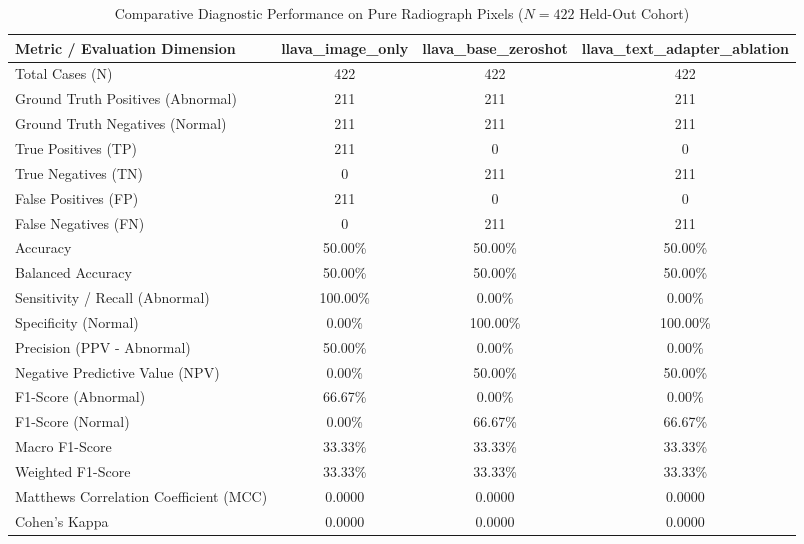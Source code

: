 \documentclass{IEEEtran}
\begin{document}
\begin{table}[t]
\centering
\caption{Comparative Diagnostic Performance on Pure Radiograph Pixels ($N = 422$ Held-Out Cohort)}
\label{tab:image_only_comparison}
\begin{tabular}{lccc}
\toprule
\textbf{Metric / Evaluation Dimension} & \textbf{llava\_image\_only} & \textbf{llava\_base\_zeroshot} & \textbf{llava\_text\_adapter\_ablation} \\
\midrule
Total Cases (N) & 422 & 422 & 422 \\
Ground Truth Positives (Abnormal) & 211 & 211 & 211 \\
Ground Truth Negatives (Normal) & 211 & 211 & 211 \\
True Positives (TP) & 211 & 0 & 0 \\
True Negatives (TN) & 0 & 211 & 211 \\
False Positives (FP) & 211 & 0 & 0 \\
False Negatives (FN) & 0 & 211 & 211 \\
Accuracy & 50.00\% & 50.00\% & 50.00\% \\
Balanced Accuracy & 50.00\% & 50.00\% & 50.00\% \\
Sensitivity / Recall (Abnormal) & 100.00\% & 0.00\% & 0.00\% \\
Specificity (Normal) & 0.00\% & 100.00\% & 100.00\% \\
Precision (PPV - Abnormal) & 50.00\% & 0.00\% & 0.00\% \\
Negative Predictive Value (NPV) & 0.00\% & 50.00\% & 50.00\% \\
F1-Score (Abnormal) & 66.67\% & 0.00\% & 0.00\% \\
F1-Score (Normal) & 0.00\% & 66.67\% & 66.67\% \\
Macro F1-Score & 33.33\% & 33.33\% & 33.33\% \\
Weighted F1-Score & 33.33\% & 33.33\% & 33.33\% \\
Matthews Correlation Coefficient (MCC) & 0.0000 & 0.0000 & 0.0000 \\
Cohen's Kappa & 0.0000 & 0.0000 & 0.0000 \\
\bottomrule
\end{tabular}
\end{table}
\end{document}
